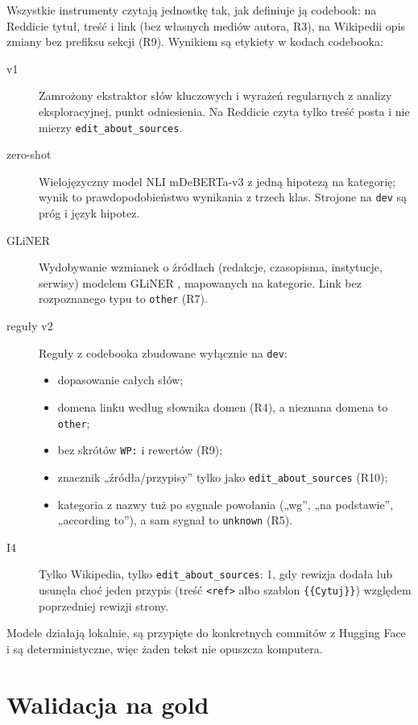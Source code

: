 \documentclass[11pt,a4paper]{article}
\newcommand{\kod}[1]{\texttt{#1}}
\begin{document}
Wszystkie instrumenty czytają jednostkę tak, jak definiuje ją codebook: na Reddicie tytuł, treść i link (bez własnych mediów autora, R3), na Wikipedii opis zmiany bez prefiksu sekcji (R9). Wynikiem są etykiety w kodach codebooka:
\begin{description}
  \item[v1] Zamrożony ekstraktor słów kluczowych i wyrażeń regularnych z analizy eksploracyjnej, punkt odniesienia. Na Reddicie czyta tylko treść posta i nie mierzy \kod{edit\_about\_sources}.
  \item[zero-shot] Wielojęzyczny model NLI mDeBERTa-v3 \cite{laurer2024} z jedną hipotezą na kategorię; wynik to prawdopodobieństwo wynikania z trzech klas. Strojone na \kod{dev} są próg i język hipotez.
  \item[GLiNER] Wydobywanie wzmianek o źródłach (redakcje, czasopisma, instytucje, serwisy) modelem GLiNER \cite{zaratiana2024}, mapowanych na kategorie. Link bez rozpoznanego typu to \kod{other} (R7).
  \item[reguły v2] Reguły z codebooka zbudowane wyłącznie na \kod{dev}:
    \begin{itemize}
      \item dopasowanie całych słów;
      \item domena linku według słownika domen (R4), a nieznana domena to \kod{other};
      \item bez skrótów \kod{WP:} i rewertów (R9);
      \item znacznik „źródła/przypisy” tylko jako \kod{edit\_about\_sources} (R10);
      \item kategoria z nazwy tuż po sygnale powołania („wg”, „na podstawie”, „according to”), a sam sygnał to \kod{unknown} (R5).
    \end{itemize}
  \item[I4] Tylko Wikipedia, tylko \kod{edit\_about\_sources}: 1, gdy rewizja dodała lub usunęła choć jeden przypis (treść \kod{<ref>} albo szablon \kod{\{\{Cytuj\}\}}) względem poprzedniej rewizji strony.
\end{description}
Modele działają lokalnie, są przypięte do konkretnych commitów z Hugging Face i są deterministyczne, więc żaden tekst nie opuszcza komputera.

\section{Walidacja na gold}
\label{sec:walidacja}
\end{document}
